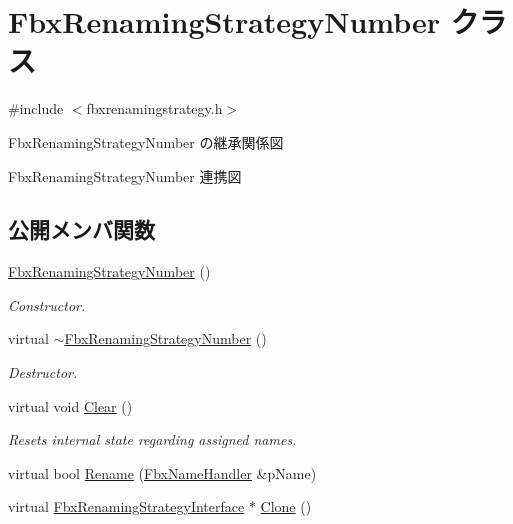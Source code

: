\hypertarget{class_fbx_renaming_strategy_number}{}\section{Fbx\+Renaming\+Strategy\+Number クラス}
\label{class_fbx_renaming_strategy_number}


{\ttfamily \#include $<$fbxrenamingstrategy.\+h$>$}



Fbx\+Renaming\+Strategy\+Number の継承関係図


Fbx\+Renaming\+Strategy\+Number 連携図
\subsection*{公開メンバ関数}
\begin{DoxyCompactItemize}
\item 
\hyperlink{class_fbx_renaming_strategy_number_a804b86f501a15158ce4c8b6b065e682d}{Fbx\+Renaming\+Strategy\+Number} ()
\begin{DoxyCompactList}\small\item\em Constructor. \end{DoxyCompactList}\item 
virtual \hyperlink{class_fbx_renaming_strategy_number_a1ad543ecf2a3fe15324dd01f69c35ac1}{$\sim$\+Fbx\+Renaming\+Strategy\+Number} ()
\begin{DoxyCompactList}\small\item\em Destructor. \end{DoxyCompactList}\item 
virtual void \hyperlink{class_fbx_renaming_strategy_number_aaf762d4d2ab243e6868b5d77a3ed8040}{Clear} ()
\begin{DoxyCompactList}\small\item\em Resets internal state regarding assigned names. \end{DoxyCompactList}\item 
virtual bool \hyperlink{class_fbx_renaming_strategy_number_ae619f9e95e3fcb215a12728dfb739659}{Rename} (\hyperlink{class_fbx_name_handler}{Fbx\+Name\+Handler} \&p\+Name)
\item 
virtual \hyperlink{class_fbx_renaming_strategy_interface}{Fbx\+Renaming\+Strategy\+Interface} $\ast$ \hyperlink{class_fbx_renaming_strategy_number_a05a9960c25cbbabb79ab020930fed395}{Clone} ()
\end{DoxyCompactItemize}


